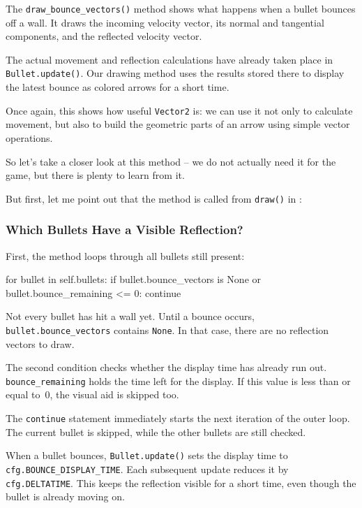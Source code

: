 The \texttt{draw\_bounce\_vectors()} method shows what happens when a bullet bounces off a wall. It draws the incoming velocity vector, its normal and tangential components, and the reflected velocity vector.

The actual movement and reflection calculations have already taken place in \texttt{Bullet.update()}. Our drawing method uses the results stored there to display the latest bounce as colored arrows for a short time.

Once again, this shows how useful \texttt{Vector2} is: we can use it not only to calculate movement, but also to build the geometric parts of an arrow using simple vector operations.

So let's take a closer look at this method -- we do not actually need it for the game, but there is plenty to learn from it.

But first, let me point out that the method is called from \texttt{draw()} in :


\subsubsection*{Which Bullets Have a Visible Reflection?}

First, the method loops through all bullets still present:
\begin{codebox}
for bullet in self.bullets:
    if bullet.bounce_vectors is None or bullet.bounce_remaining <= 0:
        continue
\end{codebox}

Not every bullet has hit a wall yet. Until a bounce occurs, \texttt{bullet.bounce\_vectors} contains \texttt{None}.
In that case, there are no reflection vectors to draw.

The second condition checks whether the display time has already run out. \texttt{bounce\_re\-main\-ing} holds the time left for the display.
If this value is less than or equal to~0, the visual aid is skipped too.

The \texttt{continue} statement immediately starts the next iteration of the outer loop. The current bullet is skipped, while the other bullets are still checked.

When a bullet bounces, \texttt{Bullet.update()} sets the display time to \texttt{cfg.BOUNCE\_DIS\-PLAY\-\_TIME}. Each subsequent update reduces it by \texttt{cfg.DELTATIME}. This keeps the reflection visible for a short time, even though the bullet is already moving on.

